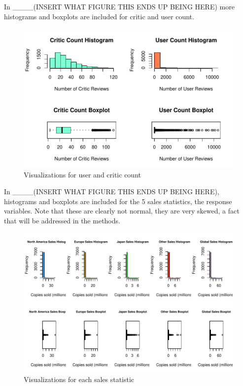 \documentclass[12pt]{article}
\begin{document}
In ____(INSERT WHAT FIGURE THIS ENDS UP BEING HERE) more histograms and boxplots are included for critic and user count.
\begin{figure}[tbp]
  \centering
  \includegraphics[width=\textwidth]{histandboxpt2.pdf}
  \caption{Visualizations for user and critic count}
  \label{fig:histandboxpt2}
\end{figure}

In ____(INSERT WHAT FIGURE THIS ENDS UP BEING HERE), histograms and boxplots are included for the 5 sales statistics, the response variables.
Note that these are clearly not normal, they are very skewed, a fact that will be addressed in the methods.
\begin{figure}[tbp]
  \centering
  \includegraphics[width=\textwidth]{histandboxsales.pdf}
  \caption{Visualizations for each sales statistic}
  \label{fig:histandboxsales}
\end{figure}
\end{document}

